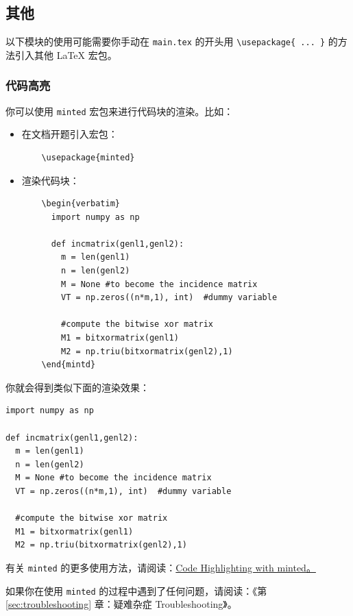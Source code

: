 \subsection{其他}

以下模块的使用可能需要你手动在 \texttt{main.tex} 的开头用 \verb|\usepackage{ ... }| 的方法引入其他 {\LaTeX} 宏包。

\subsubsection{代码高亮}

你可以使用 \texttt{minted} 宏包来进行代码块的渲染。比如：

\begin{itemize}
  \item 在文档开题引入宏包：
        \begin{verbatim}
    \usepackage{minted}
  \end{verbatim}
  \item 渲染代码块：
        \begin{verbatim}
    \begin{verbatim}
      import numpy as np

      def incmatrix(genl1,genl2):
        m = len(genl1)
        n = len(genl2)
        M = None #to become the incidence matrix
        VT = np.zeros((n*m,1), int)  #dummy variable

        #compute the bitwise xor matrix
        M1 = bitxormatrix(genl1)
        M2 = np.triu(bitxormatrix(genl2),1)
    \end{mintd}
  \end{verbatim}
\end{itemize}

你就会得到类似下面的渲染效果：

\begin{verbatim}
import numpy as np

def incmatrix(genl1,genl2):
  m = len(genl1)
  n = len(genl2)
  M = None #to become the incidence matrix
  VT = np.zeros((n*m,1), int)  #dummy variable

  #compute the bitwise xor matrix
  M1 = bitxormatrix(genl1)
  M2 = np.triu(bitxormatrix(genl2),1)
\end{verbatim}

有关 \texttt{minted} 的更多使用方法，请阅读：\href{https://www.overleaf.com/learn/latex/Code_Highlighting_with_minted}{Code Highlighting with minted。}

如果你在使用 \texttt{minted} 的过程中遇到了任何问题，请阅读：《第 \ref{sec:troubleshooting} 章：疑难杂症 Troubleshooting》。

